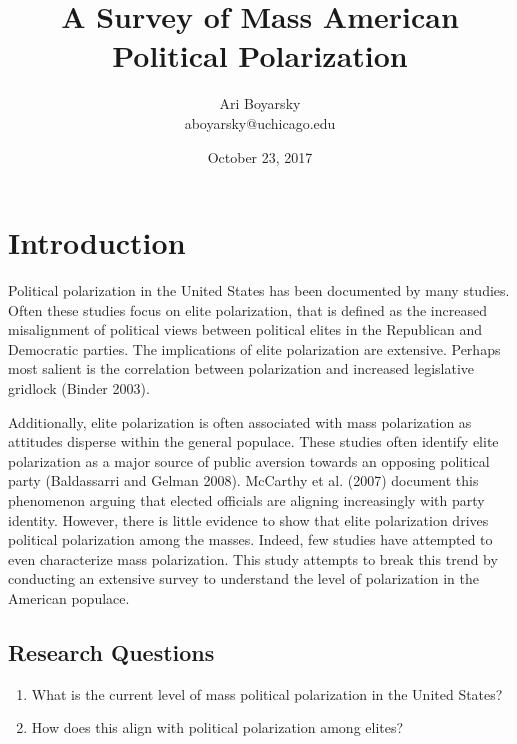 \documentclass[12pt]{article}
\begin{document}

\title{A Survey of Mass American Political Polarization}
\author{Ari Boyarsky \\ aboyarsky@uchicago.edu}
\date{October 23, 2017}



\maketitle


\section{Introduction}

Political polarization in the United States has been documented by many studies. Often these studies focus on elite polarization, that is defined as the increased misalignment of political views between political elites in the Republican and Democratic parties. The implications of elite polarization are extensive. Perhaps most salient is the correlation between polarization and increased legislative gridlock (Binder 2003).

Additionally, elite polarization is often associated with mass polarization as attitudes disperse within the general populace. These studies often identify elite polarization as a major source of public aversion towards an opposing political party (Baldassarri and Gelman 2008). McCarthy et al. (2007) document this phenomenon arguing that elected officials are aligning increasingly with party identity. However, there is little evidence to show that elite polarization drives political polarization among the masses. Indeed, few studies have attempted to even characterize mass polarization. This study attempts to break this trend by conducting an extensive survey to understand the level of polarization in the American populace.

\subsection{Research Questions}
\begin{enumerate}
	\item What is the current level of mass political polarization in the United States?
	\item How does this align with political polarization among elites?
\end{enumerate}
\end{document}
